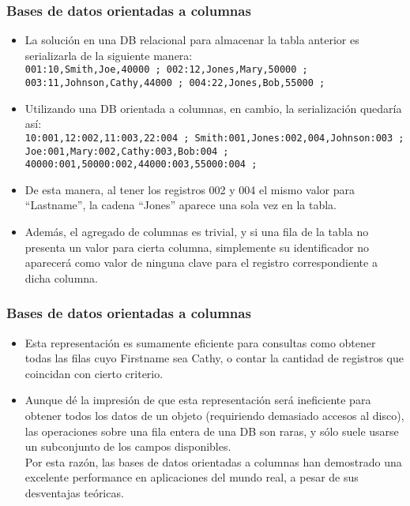 \begin{frame}
\frametitle{Bases de datos orientadas a columnas}
\begin{itemize}
\item	La solución en una DB relacional para almacenar la tabla anterior es serializarla de la siguiente manera: \\
		\texttt{001:10,Smith,Joe,40000 ; 002:12,Jones,Mary,50000 ; 003:11,Johnson,Cathy,44000 ; 004:22,Jones,Bob,55000 ;}
		\pause
\item	Utilizando una DB orientada a columnas, en cambio, la serialización quedaría así: \\
		\texttt{10:001,12:002,11:003,22:004 ; Smith:001,Jones:002,004,Johnson:003 ; Joe:001,Mary:002,Cathy:003,Bob:004 ; 40000:001,50000:002,44000:003,55000:004 ;}
		\pause
\item	De esta manera, al tener los registros 002 y 004 el mismo valor para ``Lastname'', la cadena ``Jones'' aparece una sola vez en la tabla. \pause
\item	Además, el agregado de columnas es trivial, y si una fila de la tabla no presenta un valor para cierta columna, simplemente su identificador no aparecerá como valor de ninguna clave para el registro correspondiente a dicha columna.
\end{itemize}
\end{frame}

\begin{frame}
\frametitle{Bases de datos orientadas a columnas}
\begin{itemize}
\item	Esta representación es sumamente eficiente para consultas como obtener todas las filas cuyo Firstname sea Cathy, o contar la cantidad de registros que coincidan con cierto criterio. \pause
\item	Aunque dé la impresión de que esta representación será ineficiente para obtener todos los datos de un objeto (requiriendo demasiado accesos al disco), las operaciones sobre una fila entera de una DB son raras, y sólo suele usarse un subconjunto de los campos disponibles. \pause \\
		Por esta razón, las bases de datos orientadas a columnas han demostrado una excelente performance en aplicaciones del mundo real, a pesar de sus desventajas teóricas.
\end{itemize}
\end{frame}
